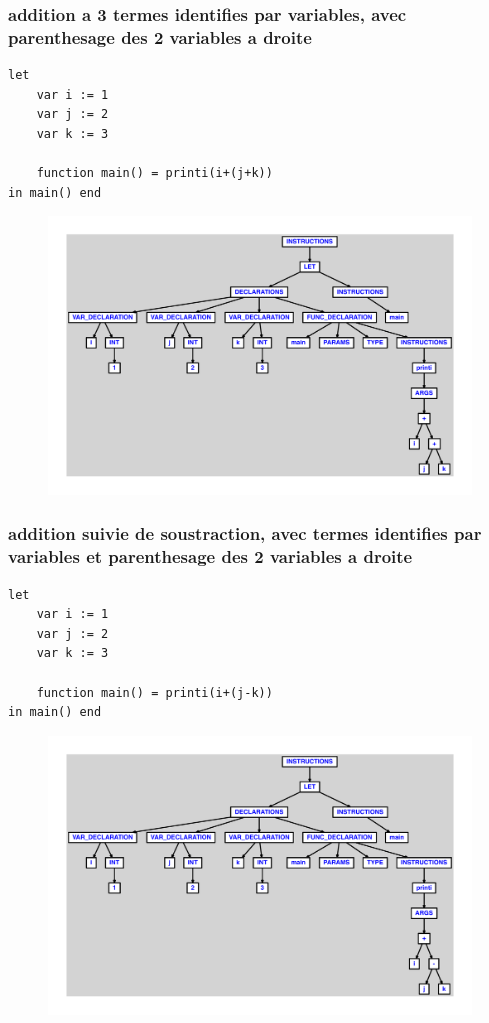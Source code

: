 \documentclass{article}
\begin{document}
\subsubsection{addition a 3 termes identifies par variables, avec parenthesage des 2 variables a droite}
\begin{lstlisting}
let
	var i := 1
	var j := 2
	var k := 3

	function main() = printi(i+(j+k))
in main() end
\end{lstlisting}
\newpage
\begin{figure}[H]
\centering
\includegraphics[max width=\textwidth]{ast/ast_111.pdf}
\end{figure}
\newpage
\subsubsection{addition suivie de soustraction, avec termes identifies par variables et parenthesage des 2 variables a droite}
\begin{lstlisting}
let
	var i := 1
	var j := 2
	var k := 3

	function main() = printi(i+(j-k))
in main() end
\end{lstlisting}
\newpage
\begin{figure}[H]
\centering
\includegraphics[max width=\textwidth]{ast/ast_112.pdf}
\end{figure}
\newpage
\end{document}
